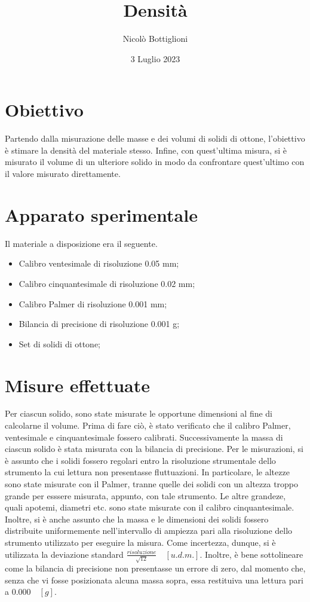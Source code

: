 \documentclass{article}
\begin{document}
	\title{Densità}
	\author{Nicolò Bottiglioni}
	\date{3 Luglio 2023}
	\maketitle
	
	\section{Obiettivo}
	Partendo dalla misurazione delle masse e dei volumi di solidi di ottone, l'obiettivo è stimare la densità del materiale stesso. Infine, con quest'ultima misura, si è misurato il volume di un ulteriore solido in modo da confrontare quest'ultimo con il valore misurato direttamente.
	
	\section{Apparato sperimentale}
	Il materiale a disposizione era il seguente.
	\begin{itemize}
	\item Calibro ventesimale di risoluzione 0.05 mm;
	\item Calibro cinquantesimale di risoluzione 0.02 mm;
	\item Calibro Palmer di risoluzione 0.001 mm;
	\item Bilancia di precisione di risoluzione 0.001 g;
	\item Set di solidi di ottone;
	\end{itemize}
	
	\section{Misure effettuate}
	Per ciascun solido, sono state misurate le opportune dimensioni al fine di calcolarne il volume. Prima di fare ciò, è stato verificato che il calibro Palmer, ventesimale e cinquantesimale fossero calibrati. Successivamente la massa di ciascun solido è stata misurata con la bilancia di precisione. Per le misurazioni, si è assunto che i solidi fossero regolari entro la risoluzione strumentale dello strumento la cui lettura non presentasse fluttuazioni. In particolare, le altezze sono state misurate con il Palmer, tranne quelle dei solidi con un altezza troppo grande per esssere misurata, appunto, con tale strumento. Le altre grandeze, quali apotemi, diametri etc. sono state misurate con il calibro cinquantesimale. Inoltre, si è anche assunto che la massa e le dimensioni dei solidi fossero distribuite uniformemente nell'intervallo di ampiezza pari alla risoluzione dello strumento utilizzato per eseguire la misura. Come incertezza, dunque, si è utilizzata la deviazione standard $\frac{risoluzione}{\sqrt{12}} \quad [u.d.m.]$. Inoltre, è bene sottolineare come la bilancia di precisione non presentasse un errore di zero, dal momento che, senza che vi fosse posizionata alcuna massa sopra, essa restituiva una lettura pari a $0.000 \quad	[g]$. 
	
\end{document}
